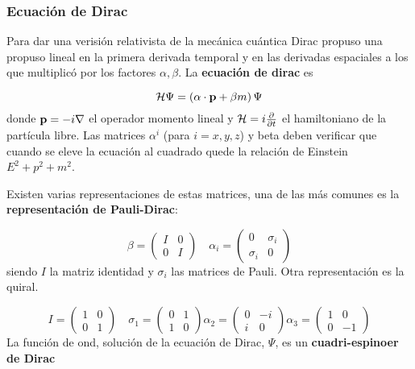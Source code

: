 \subsubsection{Ecuación de Dirac}


Para dar una verisión relativista de la mecánica cuántica Dirac propuso una propuso lineal en la primera derivada temporal y en las derivadas espaciales a los que multiplicó por los factores $\alpha,\beta$. La \textbf{ecuación de dirac} es

\begin{equation}
	\mathcal{H} \Psi = \left( \alpha \cdot \mathbf{p} + \beta m \right) \Psi
\end{equation}
donde $\mathbf{p}=-i\nabla$ el operador momento lineal y $\mathcal{H} = i \frac{\partial }{\partial t}$ el hamiltoniano de la partícula libre. Las matrices $\alpha^i$ (para $i=x,y,z$) y beta deben verificar que cuando se eleve la ecuación al cuadrado quede la relación de Einstein $E^2+p^2 + m^2$. 

Existen varias representaciones de estas matrices, una de las más comunes es la  \textbf{representación de Pauli-Dirac}:

\begin{equation}
	\beta = \begin{pmatrix}
 	I & 0 \\ 0 & I 
	\end{pmatrix} \quad 
	\alpha_i = \begin{pmatrix}
	0 & \sigma_i \\ \sigma_i & 0 
	\end{pmatrix}
\end{equation}
siendo $I$ la matriz identidad y $\sigma_i$ las matrices de Pauli. Otra representación es la quiral. 


\begin{equation}
	I = \begin{pmatrix}
		1 & 0 \\ 0 & 1
	\end{pmatrix} \quad 
	\sigma_1 = \begin{pmatrix}
		0 & 1 \\ 1 & 0 
	\end{pmatrix}
	\alpha_2 = \begin{pmatrix}
	0 & -i \\ i & 0 
	\end{pmatrix}
	\alpha_3 = \begin{pmatrix}
	1 & 0 \\ 0 & -1
	\end{pmatrix}
\end{equation}
La función de ond, solución de la ecuación de Dirac, $\Psi$, es un \textbf{cuadri-espinoer de Dirac} 

